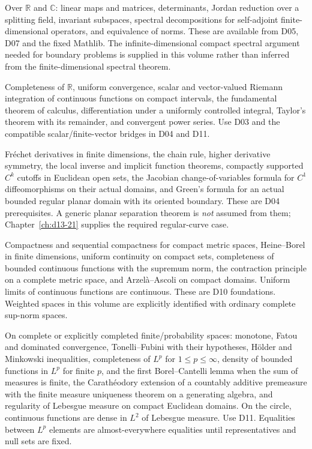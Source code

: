 \documentclass[11pt,oneside]{book}
\theoremstyle{definition}
\theoremstyle{remark}\newtheorem{remark}[theorem]{Remark}
\newcommand{\R}{\mathbb R}\newcommand{\C}{\mathbb C}
\begin{document}
\begin{description}[style=nextline,leftmargin=11mm]
\item[F1. Finite-dimensional linear algebra.]
Over $\R$ and $\C$: linear maps and matrices, determinants, Jordan reduction
over a splitting field, invariant subspaces, spectral decompositions for
self-adjoint finite-dimensional operators, and equivalence of norms.
These are available from D05, D07 and the fixed Mathlib.
The infinite-dimensional compact spectral argument needed for boundary
problems is supplied in this volume rather than inferred from the
finite-dimensional spectral theorem.

\item[F2. One-variable analysis.]
Completeness of $\R$, uniform convergence, scalar and vector-valued Riemann
integration of continuous functions on compact intervals, the fundamental
theorem of calculus, differentiation under a uniformly controlled integral,
Taylor's theorem with its remainder, and convergent power series.
Use D03 and the compatible scalar/finite-vector bridges in D04 and D11.

\item[F3. Multivariable calculus.]
Fr\'echet derivatives in finite dimensions, the chain rule, higher derivative
symmetry, the local inverse and implicit function theorems, compactly
supported $C^k$ cutoffs in Euclidean open sets, the Jacobian change-of-variables
formula for $C^1$ diffeomorphisms on their actual domains, and Green's formula for an
actual bounded regular planar domain with its oriented boundary.
These are D04 prerequisites. A generic planar separation theorem is
\emph{not} assumed from them; Chapter~\ref{ch:d13-21} supplies the required
regular-curve case.

\item[F4. Metric and function-space topology.]
Compactness and sequential compactness for compact metric spaces,
Heine--Borel in finite dimensions, uniform continuity on compact sets,
completeness of bounded continuous functions with the supremum norm,
the contraction principle on a complete metric space, and Arzel\`a--Ascoli
on compact domains. Uniform limits of continuous functions are continuous.
These are D10 foundations. Weighted spaces in this volume are explicitly
identified with ordinary complete sup-norm spaces.

\item[F5. Measure and integration.]
On complete or explicitly completed finite/probability spaces: monotone,
Fatou and dominated convergence, Tonelli--Fubini with their hypotheses,
H\"older and Minkowski inequalities, completeness of $L^p$ for $1\leq p\leq
\infty$, density of bounded functions in $L^p$ for finite $p$, and the first
Borel--Cantelli lemma when the sum of measures is finite, the
Carath\'eodory extension of a countably additive premeasure with the finite
measure uniqueness theorem on a generating algebra, and regularity of
Lebesgue measure on compact Euclidean domains. On the circle,
continuous functions are dense in $L^2$ of Lebesgue measure. Use D11. Equalities
between $L^p$ elements are almost-everywhere equalities until representatives
and null sets are fixed.


\end{description}
\end{document}
